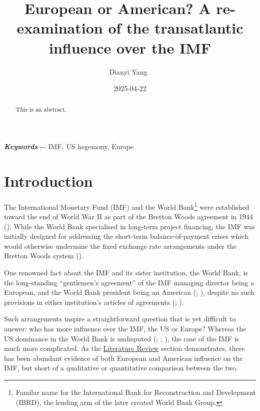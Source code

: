 \documentclass[
  letterpaper,
  abstract=true]{scrartcl}
\title{European or American? A re-examination of the transatlantic
influence over the IMF}
\author{Dianyi Yang~\orcidlink{0009-0004-4652-3429}\textsuperscript{}}
\date{2025-04-22}
\providecommand{\keywords}[1]
{
  \small	
  \textbf
{\textit{Keywords---}} #1
}
\begin{document}
\maketitle
\begin{abstract}
This is an abstract.
\end{abstract}
\begin{center}
\keywords{IMF, US hegemony, Europe}
\end{center}


\newpage

\section{Introduction}\label{introduction}

The International Monetary Fund (IMF) and the World Bank\footnote{Familar
  name for the International Bank for Reconstruction and Development
  (IBRD), the lending arm of the later created World Bank Group.} were
established toward the end of World War II as part of the Bretton Woods
agreement in 1944 (). While the
World Bank specialised in long-term project financing, the IMF was
initially designed for addressing the short-term balance-of-payment
crises which would otherwise undermine the fixed exchange rate
arrangements under the Bretton Woods system
().

One renowned fact about the IMF and its sister institution, the World
Bank, is the long-standing ``gentlemen's agreement'' of the IMF managing
director being a European, and the World Bank president being an
American (;
), despite no such provisions in
either institution's articles of agreements
(; ).

Such arrangements inspire a straightforward question that is yet
difficult to answer: who has more influence over the IMF, the US or
Europe? Whereas the US dominance in the World Bank is undisputed
(;
; ), the case of the IMF is much more complicated. As the
\hyperref[sec-litreview]{Literature Review} section demonstrates, there
has been abundant evidence of both European and American influence on
the IMF, but short of a qualitative or quantitative comparison between
the two.
\end{document}
